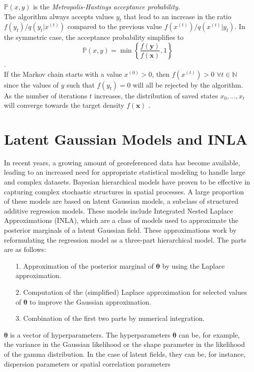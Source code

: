 $\mathbb{P}\left(x,y\right)$ is the \textit{Metropolis-Hastings acceptance probability}. \\
The algorithm always accepts values $y_t$ that lead to an increase in the ratio $f\left(y_t\right)/q\left(y_t|x^{(t)}\right)$ compared to the previous value $f\left(x^{(t)}\right)/q\left(x^{(t)}|y_t\right)$. In the symmetric case, the acceptance probability simplifies to
\begin{equation*}
     \mathbb{P}\left(x,y\right) = \min\left\lbrace\frac{f\left(\pmb{y}\right)}{f\left(\pmb{x}\right)}, 1\right\rbrace
\end{equation*}
\autocite[][]{hastings1970monte}. \\
If the Markov chain starts with a value $x^{(0)} > 0$, then $f\left(x^{(t)}\right) > 0\,\,\forall t\in\mathbb{N}$ since the values of $y$ such that $f\left(y_t\right) = 0$ will all be rejected by the algorithm. As the number of iterations $t$ increases, the distribution of saved states $x_0,...,x_t$ will converge towards the target density $f(\pmb{x})$ \autocite[][270--275]{robert2013monte}.
\clearpage
\section{Latent Gaussian Models and INLA}
In recent years, a growing amount of georeferenced data has become available, leading to an increased need for appropriate statistical modeling to handle large and complex datasets. Bayesian hierarchical models have proven to be effective in capturing complex stochastic structures in spatial processes. A large proportion of these models are based on latent Gaussian models, a subclass of structured additive regression models. These models include Integrated Nested Laplace Approximations (INLA), which are a class of models used to approximate the posterior marginals of a latent Gaussian field. These approximations work by reformulating the regression model as a three-part hierarchical model. The parts are as follows:
\begin{itemize}
    \item[1.] Approximation of the posterior marginal of $\pmb{\theta}$ by using the Laplace approximation.
    \item[2.] Computation of the (simplified) Laplace approximation for selected values of $\pmb{\theta}$ to improve the Gaussian approximation.
    \item[3.] Combination of the first two parts by numerical integration.
\end{itemize}
$\pmb{\theta}$ is a vector of hyperparameters. The hyperparameters $\pmb{\theta}$ can be, for example, the variance in the Gaussian likelihood or the shape parameter in the likelihood of the gamma distribution. In the case of latent fields, they can be, for instance, dispersion parameters or spatial correlation parameters \autocite[][]{rue2009approximate}
